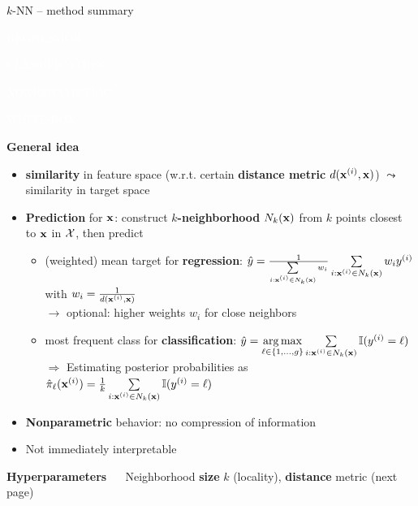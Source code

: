 \documentclass[11pt,compress,t,notes=noshow, xcolor=table]{beamer}
\newcommand{\highlight}[1]{\textcolor{hlcol}{\textbf{#1}}}
\newcommand{\maketag}[2][100]{
  \colorbox{hlcol!#1}{\textcolor{white}{\MakeUppercase{\scriptsize #2}} 
  \vphantom{}}
}
\begin{document}
\begin{vbframe}{$k$-NN -- method summary}

  \maketag{regression} \maketag{classification}
  \maketag{Nonparametric} \maketag[50]{White-box}

  \highlight{General idea}
  \begin{itemize}
    \item \textbf{similarity} in feature space (w.r.t. certain \textbf{distance metric} $d(\mathbf{x}^{(i)},\mathbf{x})$) $\leadsto$ similarity in target space 
    \item \textbf{Prediction} for $\mathbf{x}$: construct \textbf{$k$-neighborhood} 
    $N_k(\mathbf{x})$ from $k$ points closest to $\mathbf{x}$ in $\mathcal{X}$, then 
    predict
    \begin{itemize}
      \footnotesize
      \item (weighted) mean target for \textbf{regression}: 
      $\hat{y} = \tfrac{1}{\sum\limits_{i: \mathbf{x}^{(i)} \in N_k(\mathbf{x})} w_i}  
      \sum\limits_{i: \mathbf{x}^{(i)} \in N_k(\mathbf{x})} w_i y^{(i)} $ with $w_i = \tfrac{1}{d(\mathbf{x}^{(i)},\mathbf{x})}$\\
      $\rightarrow$ optional: higher weights $w_i$ for close neighbors
      \item most frequent class for \textbf{classification}: 
      $\hat{y} = \underset{\ell \in \{1, \ldots, g\}}{\mathrm{\mathop{\mathrm{arg\,max}}}} \sum\limits_{i: \mathbf{x}^{(i)} \in N_k(\mathbf{x})} \mathbb{I}(y^{(i)} = \ell)$\\
      $\Rightarrow$ Estimating posterior probabilities as $\hat{\pi}_{\ell}(\mathbf{x}^{(i)})= \frac{1}{k} \sum\limits_{i: \mathbf{x}^{(i)} \in N_k(\mathbf{x})} \mathbb{I}(y^{(i)} = \ell)$
    \end{itemize}
    \item \textbf{Nonparametric} behavior: no 
    compression of information
    \item Not immediately interpretable
  \end{itemize}

  \highlight{Hyperparameters} ~~ Neighborhood \textbf{size} $k$ (locality), 
  \textbf{distance} metric (next page)

  \vspace{5px}


\end{vbframe}
\end{document}
